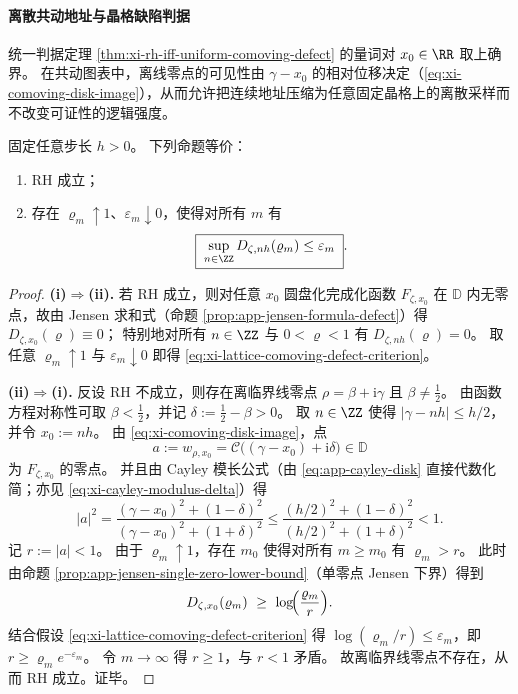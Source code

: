 \paragraph{离散共动地址与晶格缺陷判据}\label{par:xi-comoving-lattice-defect-criterion}
统一判据定理 \ref{thm:xi-rh-iff-uniform-comoving-defect} 的量词对 \(x_0\in\RR\) 取上确界。
在共动图表中，离线零点的可见性由 \(\gamma-x_0\) 的相对位移决定（\eqref{eq:xi-comoving-disk-image}），从而允许把连续地址压缩为任意固定晶格上的离散采样而不改变可证性的逻辑强度。

\begin{theorem}[晶格共动缺陷判据]\label{thm:xi-rh-iff-lattice-comoving-defect}
固定任意步长 \(h>0\)。
下列命题等价：
\begin{enumerate}
  \item[(i)] RH 成立；
  \item[(ii)] 存在 \(\varrho_m\uparrow 1\)、\(\varepsilon_m\downarrow 0\)，使得对所有 \(m\) 有
  \begin{equation}\label{eq:xi-lattice-comoving-defect-criterion}
  \boxed{\;
  \sup_{n\in\ZZ}D_{\zeta,nh}(\varrho_m)\le \varepsilon_m\; }.
  \end{equation}
\end{enumerate}
\end{theorem}

\begin{proof}
\textbf{(i)\(\Rightarrow\)(ii).}
若 RH 成立，则对任意 \(x_0\) 圆盘化完成化函数 \(F_{\zeta,x_0}\) 在 \(\mathbb{D}\) 内无零点，故由 Jensen 求和式（命题 \ref{prop:app-jensen-formula-defect}）得 \(D_{\zeta,x_0}(\varrho)\equiv 0\)；
特别地对所有 \(n\in\ZZ\) 与 \(0<\varrho<1\) 有 \(D_{\zeta,nh}(\varrho)=0\)。
取任意 \(\varrho_m\uparrow 1\) 与 \(\varepsilon_m\downarrow 0\) 即得 \eqref{eq:xi-lattice-comoving-defect-criterion}。
\par
\textbf{(ii)\(\Rightarrow\)(i).}
反设 RH 不成立，则存在离临界线零点 \(\rho=\beta+\mathrm{i}\gamma\) 且 \(\beta\neq\tfrac12\)。
由函数方程对称性可取 \(\beta<\tfrac12\)，并记 \(\delta:=\tfrac12-\beta>0\)。
取 \(n\in\ZZ\) 使得 \(|\gamma-nh|\le h/2\)，并令 \(x_0:=nh\)。
由 \eqref{eq:xi-comoving-disk-image}，点
\[
a:=w_{\rho,x_0}=\mathcal{C}\bigl((\gamma-x_0)+\mathrm{i}\delta\bigr)\in\mathbb{D}
\]
为 \(F_{\zeta,x_0}\) 的零点。
并且由 Cayley 模长公式（由 \eqref{eq:app-cayley-disk} 直接代数化简；亦见 \eqref{eq:xi-cayley-modulus-delta}）得
\[
|a|^2=\frac{(\gamma-x_0)^2+(1-\delta)^2}{(\gamma-x_0)^2+(1+\delta)^2}
\le
\frac{(h/2)^2+(1-\delta)^2}{(h/2)^2+(1+\delta)^2}
<1.
\]
记 \(r:=|a|<1\)。
由于 \(\varrho_m\uparrow 1\)，存在 \(m_0\) 使得对所有 \(m\ge m_0\) 有 \(\varrho_m>r\)。
此时由命题 \ref{prop:app-jensen-single-zero-lower-bound}（单零点 Jensen 下界）得到
\[
D_{\zeta,x_0}(\varrho_m)\ \ge\ \log\!\Bigl(\frac{\varrho_m}{r}\Bigr).
\]
结合假设 \eqref{eq:xi-lattice-comoving-defect-criterion} 得
\(
\log(\varrho_m/r)\le \varepsilon_m
\)，即
\(
r\ge \varrho_m e^{-\varepsilon_m}
\)。
令 \(m\to\infty\) 得 \(r\ge 1\)，与 \(r<1\) 矛盾。
故离临界线零点不存在，从而 RH 成立。证毕。
\end{proof}

